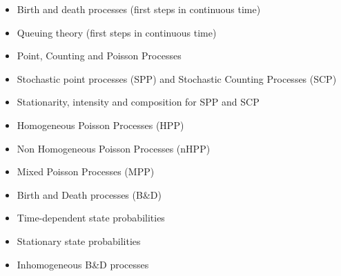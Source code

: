 \documentclass[10pt]{article}
\begin{document}
\begin{itemize}
	\item Birth and death processes (first steps in continuous time) 
	\item Queuing theory (first steps in continuous time) 
	\item Point, Counting and Poisson Processes 
	\item Stochastic point processes (SPP) and Stochastic Counting Processes (SCP) 
	\item Stationarity, intensity and composition for SPP and SCP 
	\item Homogeneous Poisson Processes (HPP) 
	\item Non Homogeneous Poisson Processes (nHPP) 
	\item Mixed Poisson Processes (MPP) 
	\item Birth and Death processes (B\&D) 
	\item Time-dependent state probabilities 
	\item Stationary state probabilities 
	\item Inhomogeneous B\&D processes 
\end{itemize}
\begin{refsection}
	\nocite{baldi2007calcolo}
	\nocite{beichelt2006stochastic}
	\printbibliography[heading=subbibliography]
\end{refsection}
\end{document}
